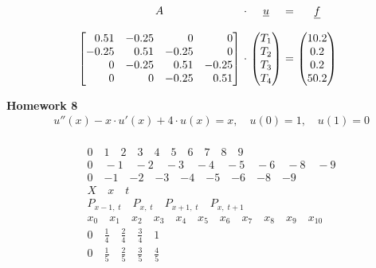\documentclass[
    final,
    a4paper,
    oneside,
    parskip=full,
    headings=standardclasses,
    headings=big,
    pointednumbers,
    fleqn,
    numbers=noenddot
]{scrartcl}
\newcommand{\fs}[2]{{\tfrac{#1}{#2}}}
\newcommand{\kl}[1]{{\left( #1 \right)}}
\begin{document}
{    \begin{align*}
        \begin{array}{c@{\ }c@{\ }c@{\ }c@{\ }c@{\ }}
            A & \cdot & \uline{u} & = & \uline{f} \\
            \\
            \begin{bmatrix*}[r]
                 0.51 & -0.25 &     0 &     0 \\
                -0.25 &  0.51 & -0.25 &     0 \\
                    0 & -0.25 &  0.51 & -0.25  \\
                    0 &     0 & -0.25 &  0.51
            \end{bmatrix*} & \cdot &
            \begin{pmatrix}
                T_1\\
                T_2 \\
                T_3 \\
                T_4
            \end{pmatrix} & = &
            \begin{pmatrix}
                10.2 \\
                0.2 \\
                0.2 \\
                50.2
            \end{pmatrix}
            \\
        \end{array}
    \end{align*}}

    {\bf{Homework 8}} \\
    {\setlength{\abovedisplayskip}{-6pt}
    \setlength{\belowdisplayskip}{-12pt}
    \begin{align*}
        &u''\kl{x} - x \cdot u'\kl{x} + 4 \cdot u\kl{x} = x, \quad u(0) = 1, \quad u(1) = 0 \\
        &
    \end{align*}}

    {\setlength{\abovedisplayskip}{-6pt}
    \setlength{\belowdisplayskip}{-12pt}
    \begin{align*}
        & 0 \quad 1 \quad 2 \quad 3 \quad 4 \quad 5 \quad 6 \quad 7 \quad 8 \quad 9 \\
        & 0 \quad -1 \quad -2 \quad -3 \quad -4 \quad -5 \quad -6 \quad -8 \quad -9 \\
        & 0 \quad {-1} \quad {-2} \quad {-3} \quad {-4} \quad {-5} \quad {-6} \quad {-8} \quad {-9} \\
        & X \quad x \quad t \\
        & P_{{x-1},\;t} \quad P_{{x},\;t} \quad P_{{x+1},\;t} \quad P_{{x},\;{t+1}} \\
        & x_0 \quad x_1 \quad x_2 \quad x_3 \quad x_4 \quad x_5 \quad x_6 \quad x_7 \quad x_8 \quad x_9 \quad x_{10} \\
        & 0 \quad \fs{1}{4} \quad \fs{2}{4} \quad \fs{3}{4} \quad 1 \\
        & 0 \quad \fs{1}{5} \quad \fs{2}{5} \quad \fs{3}{5} \quad \fs{4}{5} \\
    \end{align*}} \\

    
\end{document}
